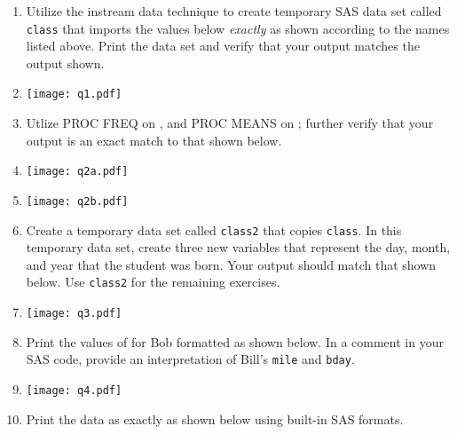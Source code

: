 \begin{enumerate}
\item Utilize the instream data technique to create temporary SAS data set called \texttt{class} that imports the values below \emph{exactly} as shown according to the names listed above.  Print the data set and verify that your output matches the output shown.\\
\begin{minipage}{0.54\textwidth}
\end{minipage}
\begin{minipage}{0.03\textwidth} \hspace{1in} \end{minipage}
\item[]\texttt{[image: q1.pdf]}
\item Utlize PROC FREQ on , and PROC MEANS on ; further verify that your output is an exact match to that shown below.
\item[] \texttt{[image: q2a.pdf]}
\item[] \texttt{[image: q2b.pdf]}
\item Create a temporary data set called \texttt{class2} that copies \texttt{class}.  In this temporary data set, create three new variables that represent the day, month, and year that the student was born.  Your output should match that shown below.  Use \texttt{class2} for the remaining exercises.
\item[] \texttt{[image: q3.pdf]}
\item Print the values of  for Bob formatted as shown below.  In a comment in your SAS code, provide an interpretation of Bill's \texttt{mile} and \texttt{bday}.
\item[] \texttt{[image: q4.pdf]}
\item Print the data as exactly as shown below using built-in SAS formats.

\end{enumerate}
